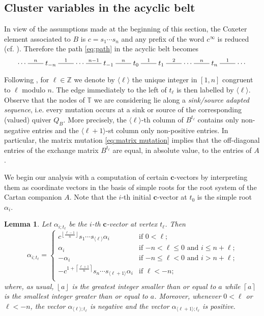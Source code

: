 \documentclass[12pt]{amsart}
\newcommand{\TT}{\mathbb{T}}
\newcommand{\ZZ}{\mathbb{Z}}
\newcommand{\bfc}{\mathbf{c}}
\newcommand{\cv}{\alpha}
\newcommand{\dashname}[1]{\stackrel{#1}{\begin{picture}(22,3)\put(0,2.5){\line(1,0){22}}\end{picture}}}
\renewcommand{\mod}[1]{\langle {#1} \rangle}
\newcommand{\Zidx}{\ell}
\newtheorem{lemma}[theorem]{Lemma}
\theoremstyle{remark}
\numberwithin{equation}{section}
\numberwithin{figure}{section}
\begin{document}
\subsection{Cluster variables in the acyclic belt}
\label{sec:acyclic_belt}

In view of the assumptions made at the beginning of this section, the Coxeter element associated to $B$ is $c=s_1\cdots s_n$ and any prefix of the word $c^\infty$ is reduced (cf. \cite{Spe09}).
Therefore the path \eqref{eq:path} in the acyclic belt becomes
\begin{equation}
  \cdots
  \dashname{n}
  t_{-n}
  \dashname{1}
  \cdots
  \dashname{n-1}
  t_{-1}
  \dashname{n}
  t_0
  \dashname{1}
  t_1
  \dashname{2}
  \cdots
  \dashname{n}
  t_n
  \dashname{1}
  \cdots
\end{equation}

Following \cite{FZ02}, for $\Zidx\in\ZZ$ we denote by $\mod{\Zidx}$ the unique integer in $[1,n]$ congruent to $\Zidx$ modulo $n$.
The edge immediately to the left of $t_\Zidx$ is then labelled by $\mod{\Zidx}$.
Observe that the nodes of $\TT$ we are considering lie along a \emph{sink/source adapted sequence}, i.e. every mutation occurs at a sink or source of the corresponding (valued) quiver $Q_B$.
More precisely, the $\mod{\Zidx}$-th column of $B^{t_\Zidx}$ contains only non-negative entries and the $\mod{\Zidx+1}$-st column only non-positive entries.
In particular, the matrix mutation \eqref{eq:matrix mutation} implies that the off-diagonal entries of the exchange matrix $B^{t_\Zidx}$ are equal, in absolute value, to the entries of $A$.

We begin our analysis with a computation of certain $\bfc$-vectors by interpreting them as coordinate vectors in the basis of simple roots for the root system of the Cartan companion $A$.  Note that the $i$-th initial $\bfc$-vector at $t_0$ is the simple root $\alpha_i$.
\begin{lemma}
  \label{lemma:c-vectors}
  Let $\cv_{i;t_\Zidx}$ be the $i$-th $\bfc$-vector at vertex $t_\Zidx$.
  Then
  \begin{equation}\label{eq:c-vectors}
    \cv_{i;t_\Zidx}
    =
    \begin{cases}
      c^{\left\lfloor\frac{\Zidx-1}{n}\right\rfloor}s_1\cdots s_{\mod{\Zidx}} \alpha_i & \text{if $0<\Zidx$;}\\
      \alpha_i & \text{if $-n < \Zidx \leq 0$ and  $i\leq n+\Zidx$;} \\
      -\alpha_i & \text{if $-n\leq \Zidx < 0$ and $i > n+\Zidx$;} \\
      -c^{1+\left\lceil\frac{\Zidx+1}{n}\right\rceil}s_n\cdots s_{\mod{\Zidx+1}} \alpha_i & \text{if $\Zidx<-n$;}\\
    \end{cases}
  \end{equation}
  where, as usual, $\left\lfloor a \right\rfloor$ is the greatest integer smaller than or equal to $a$ while $\left\lceil a \right\rceil$ is the smallest integer greater than or equal to $a$.
  Moreover, whenever $0 < \Zidx$ or $\Zidx < -n$, the vector $\cv_{\mod{\Zidx};t_\Zidx}$ is negative and the vector $\cv_{\mod{\Zidx+1};t_\Zidx}$ is positive.
\end{lemma}
\end{document}
